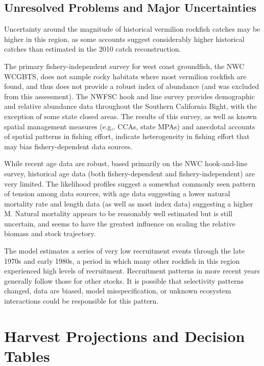 \documentclass[
  english,
  a4paper,
]{article}
\begin{document}
\hypertarget{unresolved-problems-and-major-uncertainties-1}{%
\subsection{Unresolved Problems and Major Uncertainties}\label{unresolved-problems-and-major-uncertainties-1}}

Uncertainty around the magnitude of historical vermilion rockfish catches may be higher in this region, as some accounts suggest considerably higher historical catches than estimated in the 2010 catch reconstruction.

The primary fishery-independent survey for west coast groundfish, the NWC WCGBTS, does not sample rocky habitats where most vermilion rockfish are found, and thus does not provide a robust index of abundance (and was excluded from this assessment). The NWFSC hook and line survey provides demographic and relative abundance data throughout the Southern California Bight, with the exception of some state closed areas. The results of this survey, as well as known spatial management measures (e.g,. CCAs, state MPAs) and anecdotal accounts of spatial patterns in fishing effort, indicate heterogeneity in fishing effort that may bias fishery-dependent data sources.

While recent age data are robust, based primarily on the NWC hook-and-line survey, historical age data (both fishery-dependent and fishery-independent) are very limited. The likelihood profiles suggest a somewhat commonly seen pattern of tension among data sources, with age data suggesting a lower natural mortality rate and length data (as well as most index data) suggesting a higher M. Natural mortality appears to be reasonably well estimated but is still uncertain, and seems to have the greatest influence on scaling the relative biomass and stock trajectory.

The model estimates a series of very low recruitment events through the late 1970s and early 1980s, a period in which many other rockfish in this region experienced high levels of recruitment. Recruitment patterns in more recent years generally follow those for other stocks. It is possible that selectivity patterns changed, data are biased, model misspecification, or unknown ecosystem interactions could be responsible for this pattern.

\hypertarget{harvest-projections-and-decision-tables}{%
\section{Harvest Projections and Decision Tables}\label{harvest-projections-and-decision-tables}}
\end{document}
